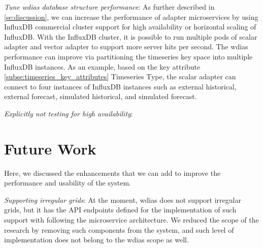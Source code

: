 \emph{Tune \acrshort{wdias} database structure performance}:
As further described in \cref{se:discussion}, we can increase the performance of adapter microservices by using InfluxDB commercial cluster support for high availability or horizontal scaling of InfluxDB. With the InfluxDB cluster, it is possible to run multiple pods of scalar adapter and vector adapter to support more server hits per second. The \acrshort{wdias} performance can improve via partitioning the timeseries key space into multiple InfluxDB instances. As an example, based on the key attribute \cref{subse:timeseries_key_attributes} Timeseries Type, the scalar adapter can connect to four instances of InfluxDB instances such as external historical, external forecast, simulated historical, and simulated forecast.

\emph{Explicitly not testing for high availability}:

\section{Future Work}
\label{se:future_work}
Here, we discussed the enhancements that we can add to improve the performance and usability of the system.

\emph{Supporting irregular grids}:
At the moment, \acrshort{wdias} does not support irregular grids, but it has the API endpoints defined for the implementation of such support with following the microservice architecture. We reduced the scope of the research by removing such components from the system, and such level of implementation does not belong to the \acrshort{wdias} scope as well.

